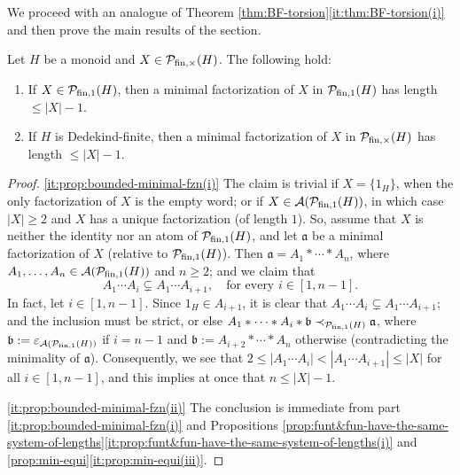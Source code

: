 We proceed with an analogue of Theorem \ref{thm:BF-torsion}\ref{it:thm:BF-torsion(i)} and then prove the main results of the section.

\begin{prop}\label{prop:bounded-minimal-fzn}
	Let $H$ be a monoid and $X \in \mathcal{P}_{\textrm{fin}, \times}(H)$. The following hold:
	\begin{enumerate}[label={\rm (\roman{*})}]
		\item\label{it:prop:bounded-minimal-fzn(i)} If $X\in \mathcal{P}_{\textrm{fin}, 1}(H)$, then a minimal factorization of $X$ in $\mathcal{P}_{\textrm{fin}, 1}(H)$ has length $\le |X|-1$.
		\item\label{it:prop:bounded-minimal-fzn(ii)} If $H$ is Dedekind-finite, then a minimal factorization of $X$ in $\mathcal{P}_{\textrm{fin}, \times}(H)$ has length $\le |X|-1$.
	\end{enumerate}
\end{prop}
%
\begin{proof}
	 \ref{it:prop:bounded-minimal-fzn(i)} The claim is trivial if $X = \{1_H\}$, when the only factorization of $X$ is the empty word; or if $X \in \mathcal{A}(\mathcal{P}_{\textrm{fin},1}(H))$, in which case $|X| \ge 2$ and $X$ has a unique factorization (of length $1$). So, assume that $X$ is neither the identity nor an atom of $\mathcal P_{\textrm{fin},1}(H)$, and let $\mathfrak a$ be a minimal factorization of $X$ (relative to $\mathcal{P}_{\textrm{fin},1}(H)$). Then $\mathfrak a = A_1*\cdots* A_n$, where $A_1, \ldots, A_n \in \mathcal{A}(\mathcal P_{\textrm{fin},1}(H))$ and $n \ge 2$; and we claim that
	 \[
	 A_1\cdots A_i \subsetneq A_1\cdots A_{i+1}, \quad \text{for every }i \in [ 1, n-1 ].
	 \]
	 In fact, let $i \in [ 1, n-1 ]$. Since $1_H \in A_{i+1}$, it is clear that $A_1\cdots A_i \subsetneq A_1\cdots A_{i+1}$; and the inclusion must be strict, or else $A_1 \ast \cdots \ast A_i \ast \mathfrak b \prec_{\mathcal P_{\textrm{fin},1}(H)} \mathfrak a$, where $\mathfrak b := \varepsilon_{\mathcal{A}(\mathcal P_{\textrm{fin},1}(H))}$ if $i = n-1$ and $\mathfrak b := A_{i+2} \ast \cdots \ast A_n$ otherwise (contradicting the minimality of $\mathfrak a$). Consequently, we see that
	 $
	 2 \le |A_1\cdots A_i | < |A_1\cdots A_{i+1}| \le |X|$ for all $i \in [ 1, n-1 ]$, and this implies at once that $n\le |X|-1$.
	
	\ref{it:prop:bounded-minimal-fzn(ii)} The conclusion is immediate from part \ref{it:prop:bounded-minimal-fzn(i)} and Propositions \ref{prop:funt&fun-have-the-same-system-of-lengths}\ref{it:prop:funt&fun-have-the-same-system-of-lengths(i)} and \ref{prop:min-equi}\ref{it:prop:min-equi(iii)}.
\end{proof}
%
